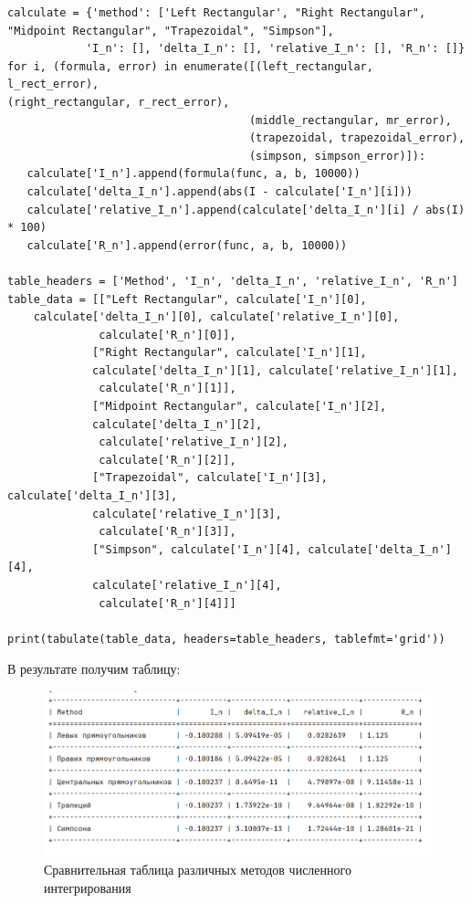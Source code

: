 \documentclass{article}
\begin{document}
\begin{lstlisting}
calculate = {'method': ['Left Rectangular', "Right Rectangular",
"Midpoint Rectangular", "Trapezoidal", "Simpson"],
            'I_n': [], 'delta_I_n': [], 'relative_I_n': [], 'R_n': []}
for i, (formula, error) in enumerate([(left_rectangular, l_rect_error), 
(right_rectangular, r_rect_error),
                                     (middle_rectangular, mr_error), 
                                     (trapezoidal, trapezoidal_error),
                                     (simpson, simpson_error)]):
   calculate['I_n'].append(formula(func, a, b, 10000))
   calculate['delta_I_n'].append(abs(I - calculate['I_n'][i]))
   calculate['relative_I_n'].append(calculate['delta_I_n'][i] / abs(I) * 100)
   calculate['R_n'].append(error(func, a, b, 10000))

table_headers = ['Method', 'I_n', 'delta_I_n', 'relative_I_n', 'R_n']
table_data = [["Left Rectangular", calculate['I_n'][0], 
    calculate['delta_I_n'][0], calculate['relative_I_n'][0],
              calculate['R_n'][0]],
             ["Right Rectangular", calculate['I_n'][1],
             calculate['delta_I_n'][1], calculate['relative_I_n'][1],
              calculate['R_n'][1]],
             ["Midpoint Rectangular", calculate['I_n'][2], 
             calculate['delta_I_n'][2],
              calculate['relative_I_n'][2],
              calculate['R_n'][2]],
             ["Trapezoidal", calculate['I_n'][3], calculate['delta_I_n'][3],
             calculate['relative_I_n'][3],
              calculate['R_n'][3]],
             ["Simpson", calculate['I_n'][4], calculate['delta_I_n'][4], 
             calculate['relative_I_n'][4],
              calculate['R_n'][4]]]

print(tabulate(table_data, headers=table_headers, tablefmt='grid'))

\end{lstlisting}

В результате получим таблицу:
\begin{figure}[H]
    \centering
    \includegraphics[width=1\textwidth]{lab_4_2.png}
    \caption{ Сравнительная таблица различных методов численного интегрирования}
    \label{fig:my_label}
\end{figure}
\end{document}
